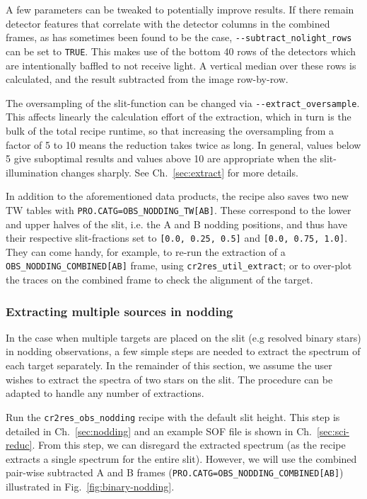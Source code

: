 A few parameters can be tweaked to potentially improve results. If there remain
detector features that correlate with the detector columns in the combined
frames, as has sometimes been found to be the case,
\verb!--subtract_nolight_rows! can be set to \verb!TRUE!. This makes use of the
bottom 40 rows of the detectors which are intentionally baffled to not receive
light. A vertical median over these rows is calculated, and the result subtracted
from the image row-by-row.

The oversampling of the slit-function can be changed via
\verb!--extract_oversample!. This affects linearly the calculation effort of the
extraction, which in turn is the bulk of the total recipe runtime, so that
increasing the oversampling from a factor of 5 to 10 means the reduction takes
twice as long. In general, values below 5 give suboptimal results and values
above 10 are appropriate when the slit-illumination changes sharply. See
Ch.~\ref{sec:extract} for more details.

In addition to the aforementioned data products, the recipe also saves two new
TW tables with \linebreak\verb!PRO.CATG=OBS_NODDING_TW[AB]!. These correspond to
the lower and upper halves of the slit, i.e. the A and B nodding positions, and
thus have their respective slit-fractions set to \verb![0.0, 0.25, 0.5]! and
\verb![0.0, 0.75, 1.0]!. They can come handy, for example, to re-run the
extraction of a \verb!OBS_NODDING_COMBINED[AB]! frame, using
\verb!cr2res_util_extract!; or to over-plot the traces on the combined frame to
check the alignment of the target.

\subsubsection{Extracting multiple sources in nodding}
\label{sec:slitfracbinary}
In the case when multiple targets are placed on the slit (e.g resolved binary
stars) in nodding observations, a few simple steps are needed to extract the spectrum 
of each target separately. In the remainder of this section, we assume the user 
wishes to extract the spectra of two stars on the slit. The procedure can be 
adapted to handle any number of extractions.
 
Run the \verb!cr2res_obs_nodding! recipe with the default slit height.
This step is detailed in Ch.~\ref{sec:nodding} and an example SOF file is
shown in Ch.~\ref{sec:sci-reduc}.
From this step, we can disregard the extracted spectrum (as the recipe extracts
a single spectrum for the entire slit). However, we will use the combined
pair-wise subtracted A and B frames (\verb!PRO.CATG=OBS_NODDING_COMBINED[AB]!)
 illustrated in Fig.~\ref{fig:binary-nodding}.

